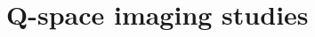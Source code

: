 \documentclass[a4paper]{book}
\begin{document}
\setcounter{tocdepth}{1}
\tableofcontents

%
%
\part{Q-space imaging studies}


%
%
%
%


\end{document}

